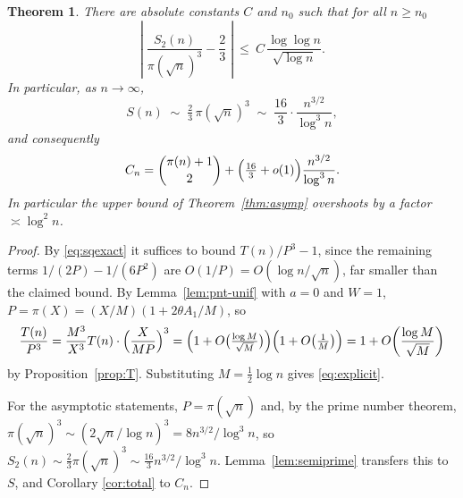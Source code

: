 \documentclass[a4paper,11pt,oneside,reqno]{amsart}
\theoremstyle{definition}
\theoremstyle{remark}
\theoremstyle{plain}
\newtheorem{theorem}[definition]{Theorem}
\begin{document}
\begin{theorem}\label{thm:error}
  There are absolute constants \(C\) and \(n_0\) such that for all \(n \ge n_0\)
  \begin{equation}\label{eq:explicit}
    \left|\;\frac{S_2(n)}{\pi(\sqrt n)^{3}}-\frac{2}{3}\;\right|
      \ \le \ C\,\frac{\log\log n}{\sqrt{\log n}} .
  \end{equation}
  In particular, as \(n \to \infty\),
  \begin{equation}\label{eq:Sasymp}
    S(n)\;\sim \;\tfrac{2}{3}\,\pi(\sqrt n)^{3}
            \;\sim \;\frac{16}{3} \cdot \frac{n^{3/2}}{\log^{3}n},
  \end{equation}
  and consequently
  \begin{equation}\label{eq:Cnexpand}
    C_n = \binom{\pi(n)+1}{2}
        +\Bigl(\tfrac{16}{3}+o(1)\Bigr)\frac{n^{3/2}}{\log^{3}n}.
  \end{equation}
  In particular the upper bound of Theorem~\ref{thm:asymp} overshoots by a
  factor \(\asymp\log^{2}n\).
\end{theorem}

\begin{proof}
  By \eqref{eq:sqexact} it suffices to bound \(T(n)/P^{3}-1\), since the
  remaining terms \(1/(2P)-1/(6P^{2})\) are \(O(1/P) = O(\log n/\sqrt n)\), far
  smaller than the claimed bound. By Lemma~\ref{lem:pnt-unif} with \(a = 0\) and
  \(W = 1\), \(P = \pi(X) = (X/M)(1+2\theta A_1/M)\), so
  \[
    \frac{T(n)}{P^{3}} = \frac{M^{3}}{X^{3}}T(n) \cdot \Bigl(\frac{X}{MP}\Bigr)^{3}
      =\Bigl(1+O\bigl(\tfrac{\log M}{\sqrt M}\bigr)\Bigr)
       \Bigl(1+O\bigl(\tfrac{1}{M}\bigr)\Bigr)
      =1+O\!\left(\frac{\log M}{\sqrt M}\right)
  \]
  by Proposition~\ref{prop:T}. Substituting \(M = \tfrac{1}{2}\log n\) gives
  \eqref{eq:explicit}.

  For the asymptotic statements, \(P = \pi(\sqrt n)\) and, by the prime number
  theorem, \(\pi(\sqrt n)^{3} \sim (2\sqrt n/\log n)^{3} = 8n^{3/2}/\log^{3}n\),
  so \(S_2(n) \sim \tfrac{2}{3}\pi(\sqrt n)^{3} \sim \tfrac{16}{3}n^{3/2}/\log^{3}n\).
  Lemma~\ref{lem:semiprime} transfers this to \(S\), and Corollary
  \ref{cor:total} to \(C_n\).
\end{proof}
\end{document}

